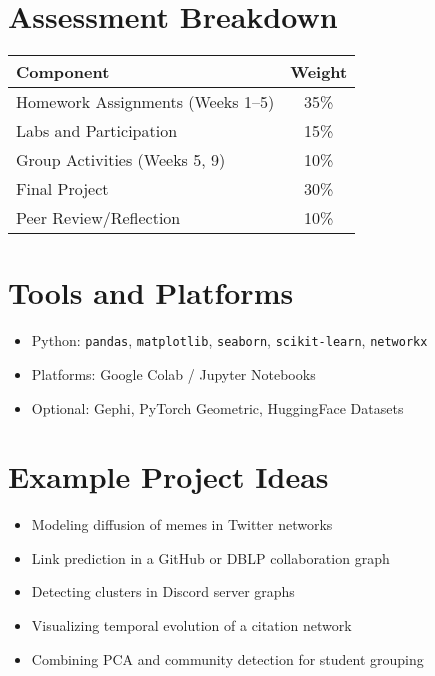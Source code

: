 \documentclass[12pt]{article}
\begin{document}
\section*{Assessment Breakdown}

\begin{tabular}{|l|c|}
\hline
\textbf{Component} & \textbf{Weight} \\
\hline
Homework Assignments (Weeks 1--5) & 35\% \\
Labs and Participation & 15\% \\
Group Activities (Weeks 5, 9) & 10\% \\
Final Project & 30\% \\
Peer Review/Reflection & 10\% \\
\hline
\end{tabular}

\section*{Tools and Platforms}
\begin{itemize}
  \item Python: \texttt{pandas}, \texttt{matplotlib}, \texttt{seaborn}, \texttt{scikit-learn}, \texttt{networkx}
  \item Platforms: Google Colab / Jupyter Notebooks
  \item Optional: Gephi, PyTorch Geometric, HuggingFace Datasets
\end{itemize}

\section*{Example Project Ideas}
\begin{itemize}
  \item Modeling diffusion of memes in Twitter networks
  \item Link prediction in a GitHub or DBLP collaboration graph
  \item Detecting clusters in Discord server graphs
  \item Visualizing temporal evolution of a citation network
  \item Combining PCA and community detection for student grouping
\end{itemize}
\end{document}
